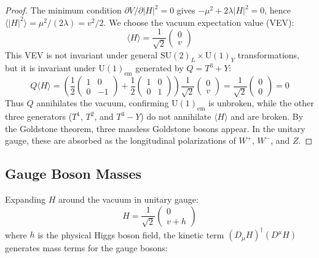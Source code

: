\documentclass[12pt]{article}
\theoremstyle{definition}
\theoremstyle{remark}
\begin{document}
\begin{proof}
The minimum condition $\partial V / \partial |H|^2 = 0$ gives $-\mu^2 + 2\lambda |H|^2 = 0$, hence $\langle |H|^2 \rangle = \mu^2/(2\lambda) = v^2/2$. We choose the vacuum expectation value (VEV):
\begin{equation}
\langle H \rangle = \frac{1}{\sqrt{2}} \begin{pmatrix} 0 \\ v \end{pmatrix}
\end{equation}
This VEV is not invariant under general $\mathrm{SU}(2)_L \times \mathrm{U}(1)_Y$ transformations, but it is invariant under $\mathrm{U}(1)_{\mathrm{em}}$ generated by $Q = T^3 + Y$:
\begin{equation}
Q \langle H \rangle = \left(\frac{1}{2}\begin{pmatrix} 1 & 0 \\ 0 & -1 \end{pmatrix} + \frac{1}{2}\begin{pmatrix} 1 & 0 \\ 0 & 1 \end{pmatrix}\right) \frac{1}{\sqrt{2}}\begin{pmatrix} 0 \\ v \end{pmatrix} = \frac{1}{\sqrt{2}}\begin{pmatrix} 0 \\ 0 \end{pmatrix} = 0
\end{equation}
Thus $Q$ annihilates the vacuum, confirming $\mathrm{U}(1)_{\mathrm{em}}$ is unbroken, while the other three generators ($T^1$, $T^2$, and $T^3 - Y$) do not annihilate $\langle H \rangle$ and are broken. By the Goldstone theorem, three massless Goldstone bosons appear. In the unitary gauge, these are absorbed as the longitudinal polarizations of $W^+$, $W^-$, and $Z$.
\end{proof}

\subsection{Gauge Boson Masses}

Expanding $H$ around the vacuum in unitary gauge:
\begin{equation}
H = \frac{1}{\sqrt{2}} \begin{pmatrix} 0 \\ v + h \end{pmatrix}
\end{equation}
where $h$ is the physical Higgs boson field, the kinetic term $(D_\mu H)^\dagger(D^\mu H)$ generates mass terms for the gauge bosons:
\end{document}
